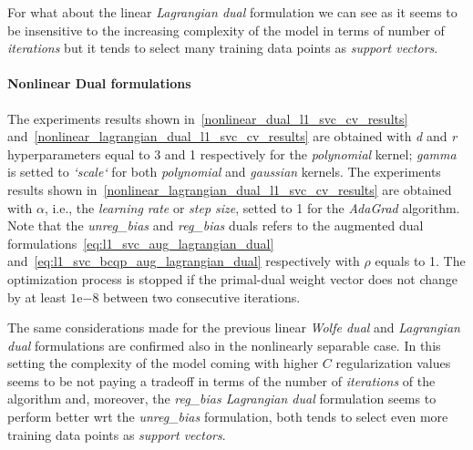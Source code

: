 For what about the linear \emph{Lagrangian dual} formulation we can see as it seems to be insensitive to the increasing complexity of the model in terms of number of \emph{iterations} but it tends to select many training data points as \emph{support vectors}.

\paragraph{Nonlinear Dual formulations}

The experiments results shown in~\ref{nonlinear_dual_l1_svc_cv_results} and~\ref{nonlinear_lagrangian_dual_l1_svc_cv_results} are obtained with \emph{d} and \emph{r} hyperparameters equal to 3 and 1 respectively for the \emph{polynomial} kernel; \emph{gamma} is setted to \emph{`scale`} for both \emph{polynomial} and \emph{gaussian} kernels. The experiments results shown in~\ref{nonlinear_lagrangian_dual_l1_svc_cv_results} are obtained with $\alpha$, i.e., the \emph{learning rate} or \emph{step size}, setted to 1 for the \emph{AdaGrad} algorithm. Note that the \emph{unreg\_bias} and \emph{reg\_bias} duals refers to the augmented dual formulations~\eqref{eq:l1_svc_aug_lagrangian_dual} and~\eqref{eq:l1_svc_bcqp_aug_lagrangian_dual} respectively with $\rho$ equals to 1. The optimization process is stopped if the primal-dual weight vector does not change by at least $1\mathrm{e}{-8}$  between two consecutive iterations.





The same considerations made for the previous linear \emph{Wolfe dual} and \emph{Lagrangian dual} formulations are confirmed also in the nonlinearly separable case. In this setting the complexity of the model coming with higher $C$ regularization values seems to be not paying a tradeoff in terms of the number of \emph{iterations} of the algorithm and, moreover, the \emph{reg\_bias Lagrangian dual} formulation seems to perform better wrt the \emph{unreg\_bias} formulation, both tends to select even more training data points as \emph{support vectors}.

